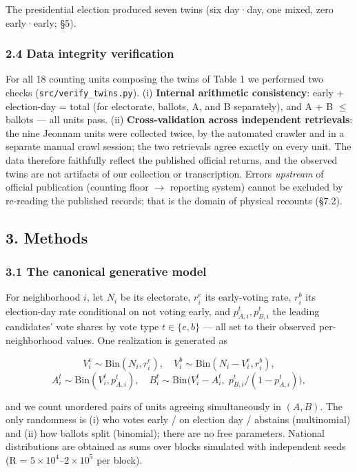 \documentclass[
  11pt,
]{article}
\begin{document}
The presidential election produced seven twins (six day·day, one mixed,
zero early·early; §5).

\subsubsection{2.4 Data integrity
verification}\label{data-integrity-verification}

For all 18 counting units composing the twins of Table 1 we performed
two checks (\texttt{src/verify\_twins.py}). (i) \textbf{Internal
arithmetic consistency}: early + election-day = total (for electorate,
ballots, A, and B separately), and A + B \(\leq\) ballots --- all units
pass. (ii) \textbf{Cross-validation across independent retrievals}: the
nine Jeonnam units were collected twice, by the automated crawler and in
a separate manual crawl session; the two retrievals agree exactly on
every unit. The data therefore faithfully reflect the published official
returns, and the observed twins are not artifacts of our collection or
transcription. Errors \emph{upstream} of official publication (counting
floor \(\to\) reporting system) cannot be excluded by re-reading the
published records; that is the domain of physical recounts (§7.2).

\subsection{3. Methods}\label{methods}

\subsubsection{3.1 The canonical generative
model}\label{the-canonical-generative-model}

For neighborhood \(i\), let \(N_i\) be its electorate, \(r^e_i\) its
early-voting rate, \(r^b_i\) its election-day rate conditional on not
voting early, and \(p^t_{A,i}, p^t_{B,i}\) the leading candidates' vote
shares by vote type \(t \in \{e, b\}\) --- all set to their observed
per-neighborhood values. One realization is generated as

\[V^e_i \sim \mathrm{Bin}(N_i, r^e_i), \quad V^b_i \sim \mathrm{Bin}(N_i - V^e_i, r^b_i),\]
\[A^t_i \sim \mathrm{Bin}(V^t_i, p^t_{A,i}), \quad B^t_i \sim \mathrm{Bin}\big(V^t_i - A^t_i,\; p^t_{B,i}/(1-p^t_{A,i})\big),\]

and we count unordered pairs of units agreeing simultaneously in
\((A, B)\). The only randomness is (i) who votes early / on election day
/ abstains (multinomial) and (ii) how ballots split (binomial); there
are no free parameters. National distributions are obtained as sums over
blocks simulated with independent seeds (R =
\(5{\times}10^{4}\)--\(2{\times}10^{5}\) per block).
\end{document}
